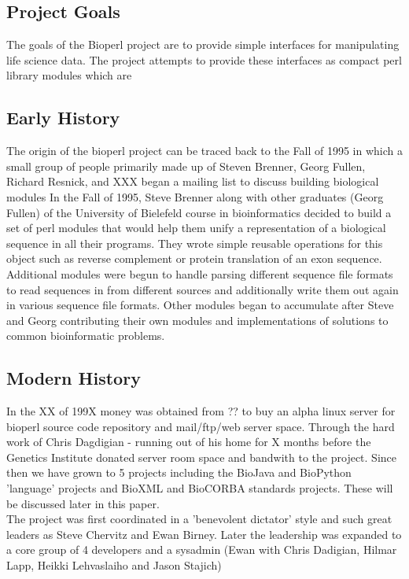 \documentclass{article}
\begin{document}
\begin{twocolumn}
\section{Project Goals} 

The goals of the Bioperl project are to provide simple interfaces for
manipulating life science data.  The project attempts to provide these
interfaces as compact perl library modules which are  

\subsection{Early History}

The origin of the bioperl project can be traced back to the Fall of
1995 in which a small group of people primarily made up of Steven
Brenner, Georg Fullen, Richard Resnick, and XXX began a mailing list
\cite{oldbioperlmaillist} to discuss building biological modules 
In the Fall of 1995, Steve Brenner along with other graduates (Georg
Fullen) of the University of Bielefeld course in bioinformatics
decided to build a set of perl modules that would help them unify a
representation of a biological sequence in all their programs.  They
wrote simple reusable operations for this object such as reverse
complement or protein translation of an exon sequence.  Additional
modules were begun to handle parsing different sequence file formats
to read sequences in from different sources and additionally write
them out again in various sequence file formats.  Other modules began
to accumulate after Steve and Georg contributing their own modules and
implementations of solutions to common bioinformatic problems.

\subsection{Modern History}
In the XX of 199X money was obtained from ?? to buy an alpha linux
server for bioperl source code repository and mail/ftp/web server space.
Through the hard work of Chris Dagdigian - running out of his home for
X months before the Genetics Institute donated server room space and
bandwith to the project.  Since then we have grown to 5 projects
including the BioJava and BioPython 'language' projects and BioXML and
BioCORBA standards projects.  These will be discussed later in this
paper. 
\\ %
The project was first coordinated in a 'benevolent dictator' style and
such great leaders as Steve Chervitz and Ewan Birney.  Later the
leadership was expanded to a core group of 4 developers and a sysadmin
(Ewan with Chris Dadigian, Hilmar Lapp, Heikki Lehvaslaiho and Jason
Stajich)



\end{twocolumn}
\end{document}
